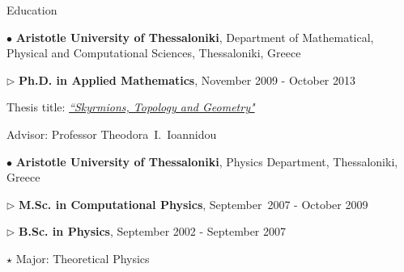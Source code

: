 \documentclass[10pt]{article} %
\newenvironment{outerlist}[1][\enskip\textbullet]%
        {\begin{itemize}[#1]}{\end{itemize}%
         \vspace{-.6\baselineskip}}
\newenvironment{innerlist}[1][\enskip\textbullet]%
        {\begin{compactitem}[#1]}{\end{compactitem}}
\begin{document}
\begin{section}{Education}
\vspace{-6.9mm} 
\begin{outerlist}
\item[$\bullet$] \textbf{Aristotle University of Thessaloniki}, Department of Mathematical, 
Physical and Computational Sciences, Thessaloniki, Greece
\begin{innerlist}
\item[$\triangleright$] \textbf{Ph.D. in Applied Mathematics}, November 2009 - October 2013
\item[] Thesis title: \href{http://phdtheses.ekt.gr/eadd/handle/10442/29355}{\emph{``Skyrmions, Topology and Geometry"}}
\item[] Advisor: Professor Theodora~I.~Ioannidou
\end{innerlist}
\item[$\bullet$] \textbf{Aristotle University of Thessaloniki}, Physics Department, Thessaloniki, Greece
\begin{innerlist}
\item[$\triangleright$] \textbf{M.Sc. in Computational Physics}, September~2007 - October 2009
\item[$\triangleright$] \textbf{B.Sc. in Physics}, September 2002 - September 2007
\begin{innerlist}
\item[$\star$] Major: Theoretical Physics
\end{innerlist}
\end{innerlist}
\end{outerlist}

\end{section}
\end{document}
